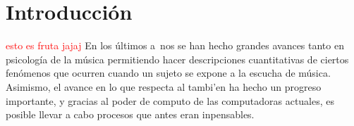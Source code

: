 \section{Introducci\'on}
\textcolor{red}{esto es fruta jajaj}\newline
En los \'ultimos a~nos se han hecho grandes avances tanto en psicolog\'ia de la m\'usica permitiendo hacer 
descripciones cuantitativas de ciertos fen\'omenos que ocurren cuando un sujeto se expone a la escucha de m\'usica.
Asimismo, el avance en lo que respecta al  tambi'en ha hecho 
un progreso importante, y gracias al poder de computo de las computadoras actuales, es posible llevar a cabo
procesos que antes eran inpensables.
